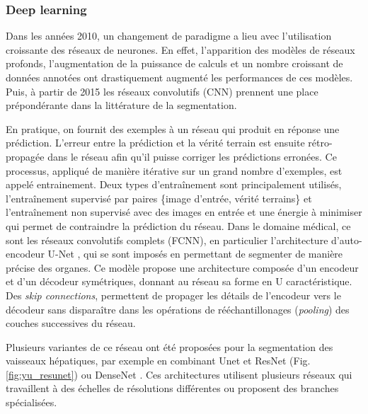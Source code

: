       \subsubsection{Deep learning}

      Dans les années 2010, un changement de paradigme a lieu avec l'utilisation croissante des réseaux de neurones. En effet, l'apparition des modèles de réseaux profonds, l'augmentation de la puissance de calculs et un nombre croissant de données annotées ont drastiquement augmenté les performances de ces modèles. Puis, à partir de 2015 les réseaux convolutifs (CNN) prennent une place prépondérante dans la littérature de la segmentation. 
      
      En pratique, on fournit des exemples à un réseau qui produit en réponse une prédiction. L'erreur entre la prédiction et la vérité terrain est ensuite rétro-propagée dans le réseau afin qu'il puisse corriger les prédictions erronées. Ce processus, appliqué de manière itérative sur un grand nombre d'exemples, est appelé entrainement. Deux types d'entraînement sont principalement utilisés, l'entraînement supervisé par paires \{image d'entrée, vérité terrains\} et l'entraînement non supervisé avec des images en entrée et une énergie à minimiser qui permet de contraindre la prédiction du réseau.
      Dans le domaine médical, ce sont les réseaux convolutifs complets (FCNN), en particulier l'architecture d'auto-encodeur U-Net \cite{Ronneberger2015_Unet}, qui se sont imposés en permettant de segmenter de manière précise des organes. Ce modèle propose une architecture composée d'un encodeur et d'un décodeur symétriques, donnant au réseau sa forme en U caractéristique. Des \textit{skip connections}, permettent de propager les détails de l'encodeur vers le décodeur sans disparaître dans les opérations de rééchantillonages (\textit{pooling}) des couches successives du réseau.

      Plusieurs variantes de ce réseau ont été proposées pour la segmentation des vaisseaux hépatiques, par exemple en combinant Unet et ResNet \cite{yu2019_liver_ResUnet}(Fig. \ref{fig:yu_resunet}) ou DenseNet \cite{Li2018_DenseUnet}. Ces architectures utilisent plusieurs réseaux qui travaillent à des échelles de résolutions différentes ou proposent des branches spécialisées.
      
